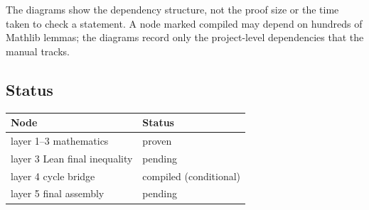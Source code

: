 The diagrams show the dependency structure, not the proof size or the
time taken to check a statement.  A node marked compiled may depend on
hundreds of Mathlib lemmas; the diagrams record only the project-level
dependencies that the manual tracks.

\subsection{Status}

\begin{center}
\small
\begin{tabular}{@{}p{}p{}@{}}
\toprule
Node & Status \\
\midrule
layer 1--3 mathematics & proven \\
layer 3 Lean final inequality & pending \\
layer 4 cycle bridge & compiled (conditional) \\
layer 5 final assembly & pending \\
\bottomrule
\end{tabular}
\end{center}
